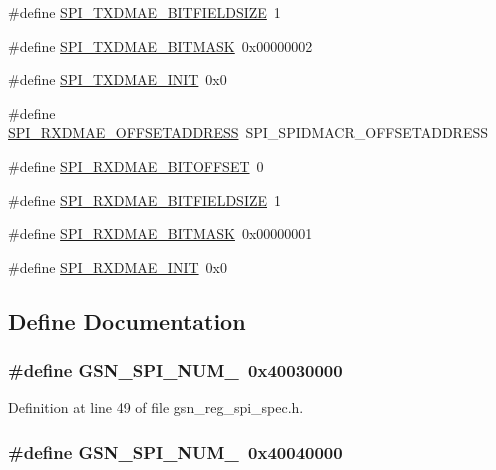 \begin{DoxyCompactItemize}
\#define \hyperlink{a00573_a6fe9249c6f7da451405b7baf2c381f37}{SPI\_\-TXDMAE\_\-BITFIELDSIZE}~1
\item 
\#define \hyperlink{a00573_aeb497e174fcd5bfcbf5ae15b8b67879d}{SPI\_\-TXDMAE\_\-BITMASK}~0x00000002
\item 
\#define \hyperlink{a00573_a05d19a398baeea4fac5ce87562c6f3ea}{SPI\_\-TXDMAE\_\-INIT}~0x0
\item 
\#define \hyperlink{a00573_a5aa989278ecd25795173121768aca2c7}{SPI\_\-RXDMAE\_\-OFFSETADDRESS}~SPI\_\-SPIDMACR\_\-OFFSETADDRESS
\item 
\#define \hyperlink{a00573_a6cd5ac85e28ff2fa0511ce564ed4dc6e}{SPI\_\-RXDMAE\_\-BITOFFSET}~0
\item 
\#define \hyperlink{a00573_a9076b370ba9d8d252f666cfdbe258d84}{SPI\_\-RXDMAE\_\-BITFIELDSIZE}~1
\item 
\#define \hyperlink{a00573_ab26e5074c50fb60c7a15bf63a549956f}{SPI\_\-RXDMAE\_\-BITMASK}~0x00000001
\item 
\#define \hyperlink{a00573_a52da47e7cb15211b390c39f07f49f015}{SPI\_\-RXDMAE\_\-INIT}~0x0
\end{DoxyCompactItemize}


\subsection{Define Documentation}
\hypertarget{a00573_aea5d7602e4be8541bc8df74dd619bc7b}{
\subsubsection[{GSN\_\-SPI\_\-NUM\_\-0}]{\setlength{\rightskip}{0pt plus 5cm}\#define GSN\_\-SPI\_\-NUM\_~0x40030000}}
\label{a00573_aea5d7602e4be8541bc8df74dd619bc7b}


Definition at line 49 of file gsn\_\-reg\_\-spi\_\-spec.h.

\hypertarget{a00573_a541265993fecdde13c3815c2cfce00d8}{
\subsubsection[{GSN\_\-SPI\_\-NUM\_\-1}]{\setlength{\rightskip}{0pt plus 5cm}\#define GSN\_\-SPI\_\-NUM\_~0x40040000}}
\label{a00573_a541265993fecdde13c3815c2cfce00d8}


